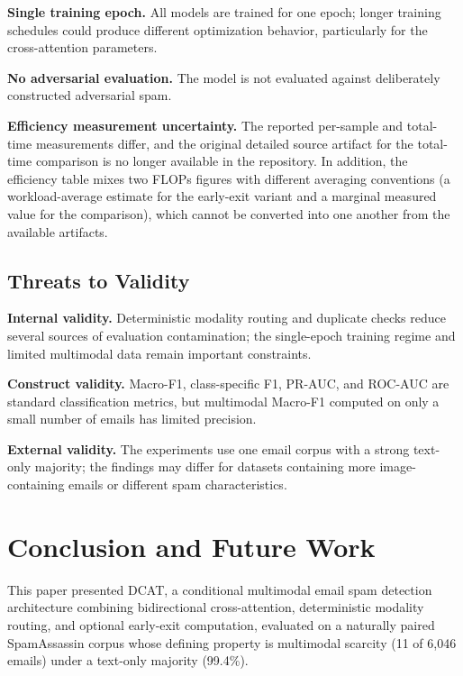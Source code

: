 \documentclass[10pt,twoside]{article}
\begin{document}
\textbf{Single training epoch.} All models are trained for one epoch; longer training schedules could produce different optimization behavior, particularly for the cross-attention parameters.

\textbf{No adversarial evaluation.} The model is not evaluated against deliberately constructed adversarial spam.

\textbf{Efficiency measurement uncertainty.} The reported per-sample and total-time measurements differ, and the original detailed source artifact for the total-time comparison is no longer available in the repository. In addition, the efficiency table mixes two FLOPs figures with different averaging conventions (a workload-average estimate for the early-exit variant and a marginal measured value for the comparison), which cannot be converted into one another from the available artifacts.

\subsection{Threats to Validity}\label{sec:threats}

\textbf{Internal validity.} Deterministic modality routing and duplicate checks reduce several sources of evaluation contamination; the single-epoch training regime and limited multimodal data remain important constraints.

\textbf{Construct validity.} Macro-F1, class-specific F1, PR-AUC, and ROC-AUC are standard classification metrics, but multimodal Macro-F1 computed on only a small number of emails has limited precision.

\textbf{External validity.} The experiments use one email corpus with a strong text-only majority; the findings may differ for datasets containing more image-containing emails or different spam characteristics.

\section{Conclusion and Future Work}\label{sec:conclusion}

This paper presented DCAT, a conditional multimodal email spam detection architecture combining bidirectional cross-attention, deterministic modality routing, and optional early-exit computation, evaluated on a naturally paired SpamAssassin corpus whose defining property is multimodal scarcity (11 of 6,046 emails) under a text-only majority (99.4\%).
\end{document}
